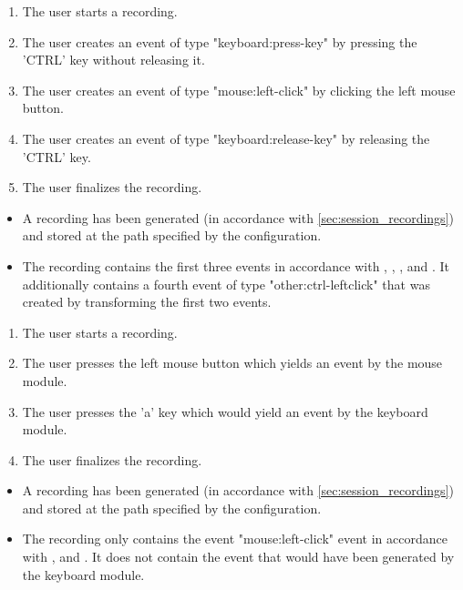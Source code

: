\begin{tests}
    {\begin{enumerate}
        \item The \gls{user} starts a recording.
        \item The \gls{user} creates an \gls{event} of type "keyboard:press-key" by pressing the 'CTRL' key without releasing it.
        \item The \gls{user} creates an \gls{event} of type "mouse:left-click" by clicking the left mouse button.
        \item The \gls{user} creates an \gls{event} of type "keyboard:release-key" by releasing the 'CTRL' key.
        \item The \gls{user} finalizes the recording.
    \end{enumerate}}
    {\begin{itemize}
        \item A recording has been generated (in accordance with \ref{sec:session_recordings}) and stored at the path specified by the configuration.
        \item The recording contains the first three events in accordance with , , ,  and . It additionally contains a fourth \gls{event} of type "other:ctrl-leftclick" that was created by transforming the first two \glspl{event}.
    \end{itemize}}

    {\begin{enumerate}
        \item The \gls{user} starts a recording.
        \item The \gls{user} presses the left mouse button which yields an \gls{event} by the mouse module.
        \item The \gls{user} presses the 'a' key which would yield an \gls{event} by the keyboard module.
        \item The \gls{user} finalizes the recording.
    \end{enumerate}}
    {\begin{itemize}
        \item A recording has been generated (in accordance with \ref{sec:session_recordings}) and stored at the path specified by the configuration.
        \item The recording only contains the \gls{event} "mouse:left-click" \gls{event} in accordance with ,  and . It does not contain the \gls{event} that would have been generated by the keyboard module.
    \end{itemize}}


\end{tests}
